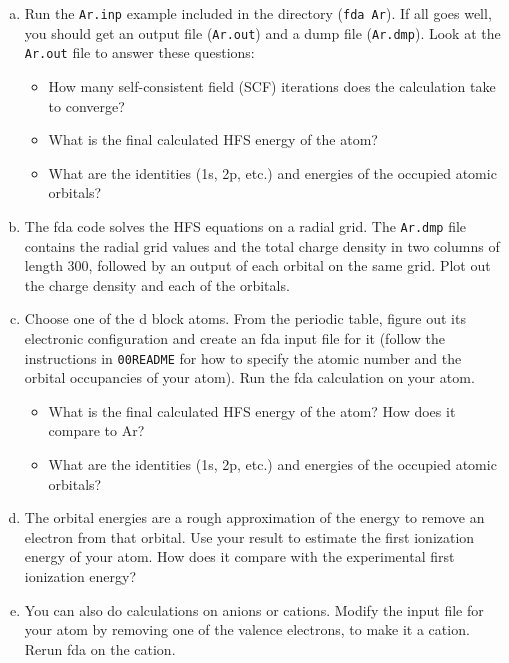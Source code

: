 \documentclass[11pt]{article}
\begin{document}
\begin{enumerate}[(a)]
\item Run the \texttt{Ar.inp} example included in the directory (\texttt{fda Ar}). If all goes well, you should get an output file (\texttt{Ar.out}) and a dump file (\texttt{Ar.dmp}). Look at the \texttt{Ar.out} file to answer these questions:

\begin{itemize}
\item How many self-consistent field (SCF) iterations does the calculation take to converge?

\item What is the final calculated HFS energy of the atom?

\item What are the identities (1s, 2p, etc.) and energies of the occupied atomic orbitals?
\end{itemize}

\item The fda code solves the HFS equations on a radial grid. The \texttt{Ar.dmp} file contains the radial grid values and the total charge density in two columns of length 300, followed by an output of each orbital on the same grid. Plot out the charge density and each of the orbitals.

\item Choose one of the d block atoms. From the periodic table, figure out its electronic configuration and create an fda input file for it (follow the instructions in \texttt{00README} for how to specify the atomic number and the orbital occupancies of your atom). Run the fda calculation on your atom.

\begin{itemize}
\item What is the final calculated HFS energy of the atom? How does it compare to Ar?

\item What are the identities (1s, 2p, etc.) and energies of the occupied atomic orbitals?
\end{itemize}

\item The orbital energies are a rough approximation of the energy to remove an electron from that orbital. Use your result to estimate the first ionization energy of your atom. How does it compare with the experimental first ionization energy?

\item You can also do calculations on anions or cations. Modify the input file for your atom by removing one of the valence electrons, to make it a cation. Rerun fda on the cation. 


\end{enumerate}
\end{document}
